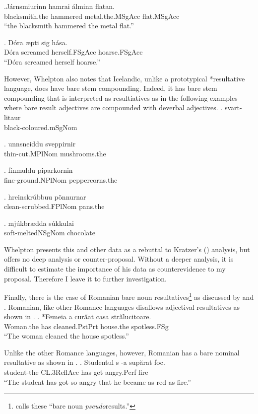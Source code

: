 \documentclass[MilwayThesis]{subfiles}
\begin{document}
\exg.J\'{a}rnsmi\dh{}urinn hamra\dh{}i \'{a}lminn flatan.\\
blacksmith.the hammered metal.the.MSgAcc flat.MSgAcc\\
``the blacksmith hammered the metal flat.''

\exg. D\'{o}ra \ae{}pti sig h\'{a}sa.\\
D\'{o}ra screamed herself.FSgAcc hoarse.FSgAcc\\
``D\'{o}ra screamed herself hoarse.''

However, Whelpton also notes that Icelandic, unlike a prototypical *resultative	language, does have bare stem compounding.
Indeed, it has bare stem compounding that is interpreted as resultiatives as in the following examples where bare result adjectives are compounded with deverbal adjectives.
\ex. svart-lita\dh{}ur\\
black-coloured.mSgNom

\ex. \th{}unnsneiddu sveppirnir\\
thin-cut.MPlNom mushrooms.the

\ex. f\'{i}nmuldu piparkornin\\
fine-ground.NPlNom peppercorns.the

\ex. hreinskr\'{u}bbu\dh{}u p\"{o}nnurnar\\
clean-scrubbed.FPlNom pans.the

\ex. mj\'{u}kbr\ae{}dda s\'{u}kkula\dh{}i\\
soft-meltedNSgNom chocolate

Whelpton presents this and other data as a rebuttal to Kratzer's (\citeyear{kratzer2004building}) analysis, but offers no deep analysis or counter-proposal.
Without a deeper analysis, it is difficult to estimate the importance of his data as counterevidence to my proposal.
Therefore I leave it to further investigation.

Finally, there is the case of Romanian bare noun resultatives\footnote{\textcite{irimia2012secondary} calls these ``bare noun \textit{pseudo}results.''} as discussed by \textcite[220--224]{irimia2012secondary} and \textcite{farkas2011predicative}.
Romanian, like other Romance languages disallows adjectival resultatives as shown in \Next.
\exg. *Femeia a cur\u{a}at casa str\u{a}lucitoare.\footnotemark\\
Woman.the has cleaned.PstPrt house.the spotless.FSg\\
``The woman cleaned the house spotless.''\parencite{irimia2012secondary}

Unlike the other Romance languages, however, Romanian has a bare nominal resultative as shown in \Next.
\exg. Studentul s -a sup\u{a}rat foc.\\
student-the CL.3ReflAcc has get angry.Perf fire\\
``The student has got so angry that he became as red as fire.''\parencite{farkas2011predicative}
\end{document}
